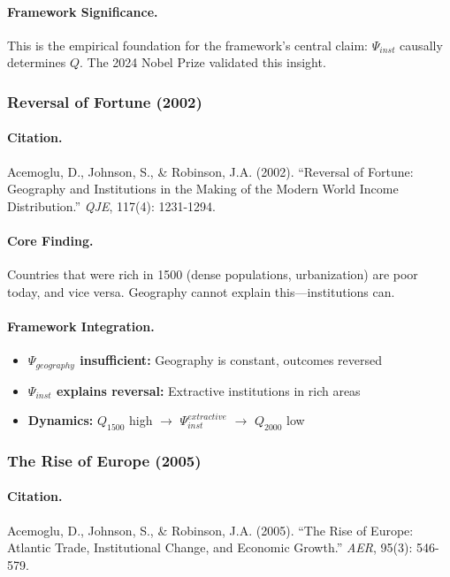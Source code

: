 \documentclass[12pt,a4paper]{article}
\begin{document}
\paragraph{Framework Significance.}
This is the empirical foundation for the framework's central claim:
$\Psi_{inst}$ causally determines $Q$. The 2024 Nobel Prize validated this insight.

\subsubsection{Reversal of Fortune (2002)}

\paragraph{Citation.}
Acemoglu, D., Johnson, S., \& Robinson, J.A. (2002).
``Reversal of Fortune: Geography and Institutions in the Making of the
Modern World Income Distribution.'' \emph{QJE}, 117(4): 1231-1294.

\paragraph{Core Finding.}
Countries that were rich in 1500 (dense populations, urbanization)
are poor today, and vice versa. Geography cannot explain this---institutions can.

\paragraph{Framework Integration.}
\begin{itemize}
  \item \textbf{$\Psi_{geography}$ insufficient:} Geography is constant, outcomes reversed
  \item \textbf{$\Psi_{inst}$ explains reversal:} Extractive institutions in rich areas
  \item \textbf{Dynamics:} $Q_{1500}$ high $\to$ $\Psi_{inst}^{extractive}$ $\to$ $Q_{2000}$ low
\end{itemize}

\subsubsection{The Rise of Europe (2005)}

\paragraph{Citation.}
Acemoglu, D., Johnson, S., \& Robinson, J.A. (2005).
``The Rise of Europe: Atlantic Trade, Institutional Change, and Economic Growth.''
\emph{AER}, 95(3): 546-579.
\end{document}
